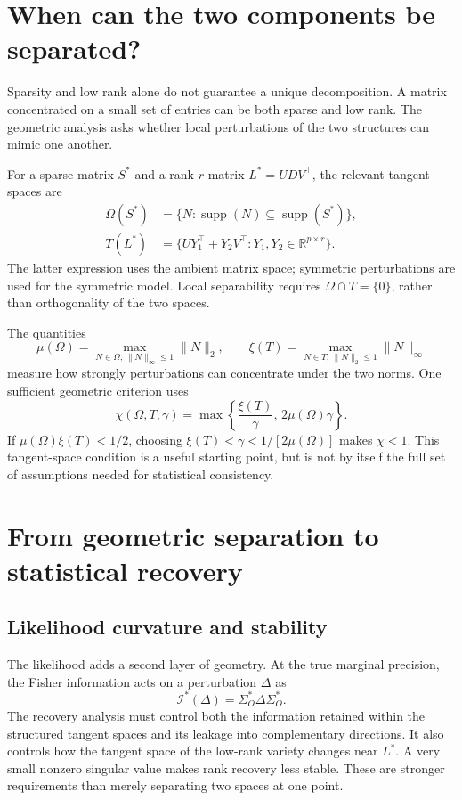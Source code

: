\documentclass[11pt]{article}
\newcommand{\supp}{\operatorname{supp}}
\begin{document}
\section{When can the two components be separated?}
Sparsity and low rank alone do not guarantee a unique decomposition. A matrix
concentrated on a small set of entries can be both sparse and low rank.
The geometric analysis asks whether local perturbations of the two structures
can mimic one another.

For a sparse matrix $S^*$ and a rank-$r$ matrix $L^*=UDV^\top$, the relevant
tangent spaces are
\begin{align}
\Omega(S^*)&=\{N:\supp(N)\subseteq\supp(S^*)\},\\
T(L^*)&=\{UY_1^\top+Y_2V^\top:Y_1,Y_2\in\mathbb R^{p\times r}\}.
\end{align}
The latter expression uses the ambient matrix space; symmetric perturbations
are used for the symmetric model. Local separability requires
$\Omega\cap T=\{0\}$, rather than orthogonality of the two spaces.

The quantities
\[
\mu(\Omega)=\max_{N\in\Omega,\,\|N\|_\infty\leq1}\|N\|_2,
\qquad
\xi(T)=\max_{N\in T,\,\|N\|_2\leq1}\|N\|_\infty
\]
measure how strongly perturbations can concentrate under the two norms.
One sufficient geometric criterion uses
\begin{equation}
\chi(\Omega,T,\gamma)=\max\left\{\frac{\xi(T)}{\gamma},\,2\mu(\Omega)\gamma\right\}.
\end{equation}
If $\mu(\Omega)\xi(T)<1/2$, choosing
$\xi(T)<\gamma<1/[2\mu(\Omega)]$ makes $\chi<1$.
This tangent-space condition is a useful starting point, but is not by itself
the full set of assumptions needed for statistical consistency.

\newpage
\section{From geometric separation to statistical recovery}
\subsection{Likelihood curvature and stability}
The likelihood adds a second layer of geometry. At the true marginal precision,
the Fisher information acts on a perturbation $\Delta$ as
\[
\mathcal I^*(\Delta)=\Sigma_O^*\Delta\Sigma_O^*.
\]
The recovery analysis must control both the information retained within the
structured tangent spaces and its leakage into complementary directions.
It also controls how the tangent space of the low-rank variety changes near
$L^*$. A very small nonzero singular value makes rank recovery less stable.
These are stronger requirements than merely separating two spaces at one point.
\end{document}
